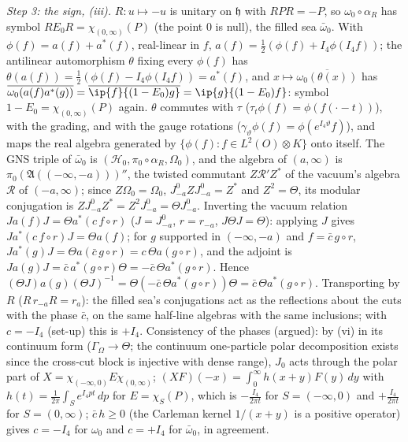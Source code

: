 \emph{Step 3: the sign, (iii).} $R : u \mapsto -u$ is unitary on $\mathfrak{h}$ with $RPR = -P$, so $\omega_{0}\circ\alpha_{R}$ has symbol $RE_{0}R = \chi_{(0,\infty)}(P)$ (the point $0$ is null), the filled sea $\bar\omega_{0}$. With $\phi(f) = a(f) + a^{*}(f)$, real-linear in $f$, $a(f) = \tfrac12(\phi(f) + I_{4}\phi(I_{4}f))$; the antilinear automorphism $\theta$ fixing every $\phi(f)$ has $\theta(a(f)) = \tfrac12(\phi(f) - I_{4}\phi(I_{4}f)) = a^{*}(f)$, and $x \mapsto \overline{\omega_{0}(\theta(x))}$ has $\overline{\omega_{0}(a(f)a^{*}(g))} = \overline{\ip{f}{(1 - E_{0})g}} = \ip{g}{(1 - E_{0})f}$: symbol $1 - E_{0} = \chi_{(0,\infty)}(P)$ again. $\theta$ commutes with $\tau$ ($\tau_{t}\phi(f) = \phi(f(\cdot - t))$), with the grading, and with the gauge rotations ($\gamma_{\vartheta}\phi(f) = \phi(e^{I_{4}\vartheta}f)$), and maps the real algebra generated by $\{\phi(f) : f \in L^{2}(O)\otimes K\}$ onto itself. The GNS triple of $\bar\omega_{0}$ is $(\mathcal{H}_{0}, \pi_{0}\circ\alpha_{R}, \Omega_{0})$, and the algebra of $(a, \infty)$ is $\pi_{0}(\mathfrak{A}((-\infty, -a)))''$, the twisted commutant $Z\mathcal{R}'Z^{*}$ of the vacuum's algebra $\mathcal{R}$ of $(-a, \infty)$; since $Z\Omega_{0} = \Omega_{0}$, $J^{0}_{-a}ZJ^{0}_{-a} = Z^{*}$ and $Z^{2} = \Theta$, its modular conjugation is $ZJ^{0}_{-a}Z^{*} = Z^{2}J^{0}_{-a} = \Theta J^{0}_{-a}$. Inverting the vacuum relation $J a(f) J = \Theta a^{*}(c\,f\circ r)$ ($J = J^{0}_{-a}$, $r = r_{-a}$, $J\Theta J = \Theta$): applying $J$ gives $Ja^{*}(c\,f\circ r)J = \Theta a(f)$; for $g$ supported in $(-\infty, -a)$ and $f = \bar c\,g\circ r$, $Ja^{*}(g)J = \Theta a(\bar c\,g\circ r) = c\,\Theta a(g\circ r)$, and the adjoint is $J a(g) J = \bar c\,a^{*}(g\circ r)\Theta = -\bar c\,\Theta a^{*}(g\circ r)$. Hence $(\Theta J)a(g)(\Theta J)^{-1} = \Theta(-\bar c\,\Theta a^{*}(g\circ r))\Theta = \bar c\,\Theta a^{*}(g\circ r)$. Transporting by $R$ ($R\,r_{-a}R = r_{a}$): the filled sea's conjugations act as the reflections about the cuts with the phase $\bar c$, on the same half-line algebras with the same inclusions; with $c = -I_{4}$ (set-up) this is $+I_{4}$. Consistency of the phases (argued): by (vi) in its continuum form ($\Gamma_{\Omega} \to \Theta$; the continuum one-particle polar decomposition exists since the cross-cut block is injective with dense range), $J_{0}$ acts through the polar part of $X = \chi_{(-\infty,0)}E\chi_{(0,\infty)}$; $(XF)(-x) = \int_{0}^{\infty}h(x + y)F(y)\,dy$ with $h(t) = \frac{1}{2\pi}\int_{S}e^{I_{4}pt}\,dp$ for $E = \chi_{S}(P)$, which is $-\frac{I_{4}}{2\pi t}$ for $S = (-\infty, 0)$ and $+\frac{I_{4}}{2\pi t}$ for $S = (0, \infty)$; $\bar c\,h \geq 0$ (the Carleman kernel $1/(x + y)$ is a positive operator) gives $c = -I_{4}$ for $\omega_{0}$ and $c = +I_{4}$ for $\bar\omega_{0}$, in agreement.


